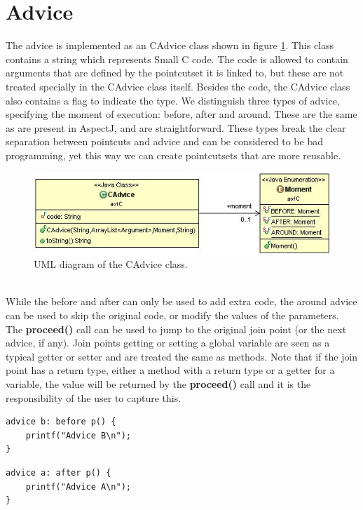 \documentclass[a4paper]{report}
\begin{document}
\section{Advice}
The advice is implemented as an CAdvice class shown in figure \ref{fig:CAdvice}. This class contains a string which represents Small C code. The code is allowed to contain arguments that are defined by the pointcutset it is linked to, but these are not treated specially in the CAdvice class itself. Besides the code, the CAdvice class also contains a flag to indicate the type. We distinguish three types of advice, specifying the moment of execution: before, after and around. These are the same as are present in AspectJ, and are straightforward. These types break the clear separation between pointcuts and advice and can be considered to be bad programming, yet this way we can create pointcutsets that are more reusable.\\
\begin{figure}[h!]
\centering
\includegraphics[scale=0.7]{images/AOFC/CAdvice.jpg}
\caption{UML diagram of the CAdvice class.}
\label{fig:CAdvice}
\end{figure}
\\
While the before and after can only be used to add extra code, the around advice can be used to skip the original code, or modify the values of the parameters. The \textbf{proceed()} call can be used to jump to the original join point (or the next advice, if any). Join points getting or setting a global variable are seen as a typical getter or setter and are treated the same as methods. Note that if the join point has a return type, either a method with a return type or a getter for a variable, the value will be returned by the \textbf{proceed()} call and it is the responsibility of the user to capture this.\\
\begin{minipage}{0.42\textwidth}
\begin{lstlisting}[caption=Example of a before advice, label=lst:SmallC_BeforeAdvice]
advice b: before p() {
	printf("Advice B\n");
}
\end{lstlisting}
\begin{lstlisting}[caption=Example of an after advice, label=lst:SmallC_AfterAdvice]
advice a: after p() {
	printf("Advice A\n");
}
\end{lstlisting}
\end{minipage}\hfill
\end{document}
